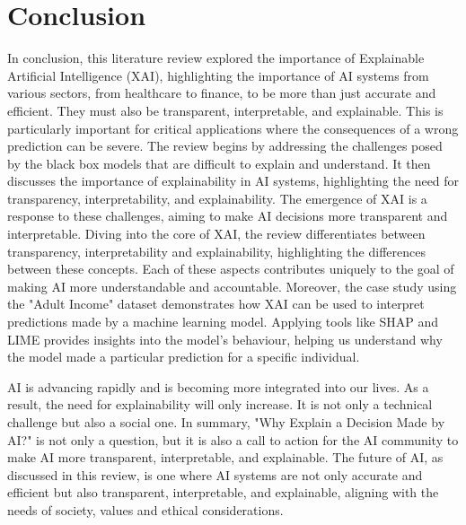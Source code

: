 \documentclass[10pt,journal,compsoc]{IEEEtran}
\begin{document}
\section{Conclusion}
In conclusion, this literature review explored the importance of Explainable Artificial Intelligence (XAI), highlighting the importance of AI systems from various sectors, from healthcare to finance, to be more than just accurate and efficient.
They must also be transparent, interpretable, and explainable. This is particularly important for critical applications where the consequences of a wrong prediction can be severe. 
The review begins by addressing the challenges posed by the black box models that are difficult to explain and understand. It then discusses the importance of explainability in AI systems, highlighting the need for transparency, interpretability, and explainability.
The emergence of XAI is a response to these challenges, aiming to make AI decisions more transparent and interpretable. Diving into the core of XAI, the review differentiates between transparency, interpretability and explainability, highlighting the differences between these concepts.
Each of these aspects contributes uniquely to the goal of making AI more understandable and accountable.
Moreover, the case study using the "Adult Income" dataset demonstrates how XAI can be used to interpret predictions made by a machine learning model. Applying tools like SHAP and LIME provides insights into the model's behaviour, helping us understand why the model made a particular prediction for a specific individual.

AI is advancing rapidly and is becoming more integrated into our lives. As a result, the need for explainability will only increase. 
It is not only a technical challenge but also a social one. 
In summary, "Why Explain a Decision Made by AI?" is not only a question, but it is also a call to action for the AI community to make AI more transparent, interpretable, and explainable. The future of AI, as discussed in this review, is one where AI systems are not only accurate and efficient but also transparent, interpretable, and explainable, aligning with the needs of society, values and ethical considerations.



\printbibliography
\end{document}
